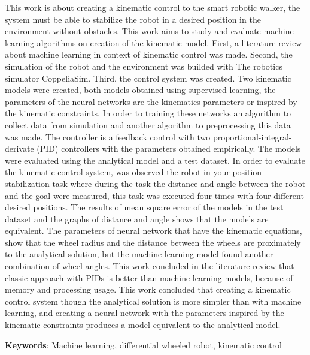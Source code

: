 This work is about creating a kinematic control to the smart robotic walker,
the system must be able to stabilize the robot in a desired position
in the environment without obstacles. This work aims to study and evaluate
machine learning algorithms
on creation of the kinematic model. First, a literature review about
machine learning in context of kinematic control was made. Second, the
simulation of the robot and the environment was builded with The robotics
simulator CoppeliaSim. Third, the control system was created.
Two kinematic models were created, both models obtained using supervised learning,
the parameters of the neural networks are the kinematics parameters or
inspired by the kinematic constraints. In order to training these networks
an algorithm to collect data from simulation
 and another algorithm to preprocessing this data was made. The controller
is a feedback control with two proportional-integral-derivate (PID) controllers
with the parameters obtained empirically. The models were evaluated using the
analytical model and a test dataset. In order to evaluate the kinematic
control system, was observed the robot in your position stabilization
task where during the task the distance and angle between the robot and
the goal were measured, this task was executed four times with four different
desired positions.
The results of mean square error of the models in the test dataset and
the graphs of distance and angle shows that the models are equivalent.
The parameters of neural network
that have the kinematic equations, show that the wheel radius and the
distance between the wheels are proximately to the analytical solution, but
the machine learning model found another combination of wheel angles.
This work concluded in the literature review that classic approach
with PIDs is better than machine learning models, because of memory
and processing usage. This work concluded that creating a kinematic
control system though the analytical solution is more simpler than
with machine learning, and creating a neural network with the parameters
inspired by the kinematic constraints produces a model equivalent to
the analytical model.



\vspace{1.5ex}

{\bf Keywords}: Machine learning, differential wheeled robot, kinematic control





